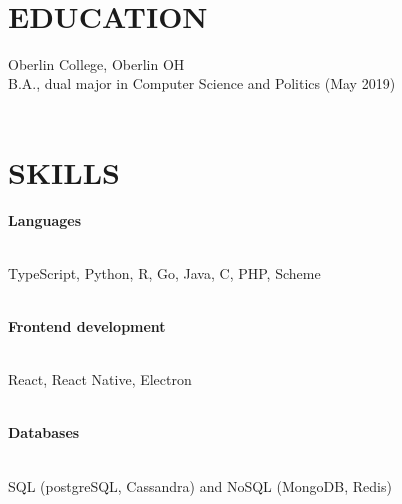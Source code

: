 \documentclass[margin]{res}
\begin{document}
\begin{resume}


\vspace{-0.5em}\\
\section{EDUCATION} Oberlin College, Oberlin OH\\
B.A., dual major in Computer Science and Politics (May 2019)\\
\vspace{-2.5em}\\
\section{SKILLS}
\textbf{Languages}\\
\vspace{-2.5em}\\
\begin{adjustwidth}{5mm}{}
TypeScript, Python, R, Go, Java, C, PHP, Scheme\\
\end{adjustwidth}
\vspace{-2em}\\

\textbf{Frontend development}\\
\vspace{-2.5em}\\
\begin{adjustwidth}{5mm}{}
React, React Native, Electron\\
\end{adjustwidth}
\vspace{-2em}\\

\textbf{Databases}\\
\vspace{-2.5em}\\
\begin{adjustwidth}{5mm}{}
SQL (postgreSQL, Cassandra) and NoSQL (MongoDB, Redis)\\
\end{adjustwidth}
\vspace{-2em}\\


\end{resume}
\end{document}
